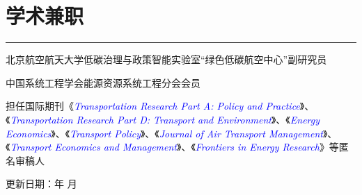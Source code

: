 \documentclass[letterpaper]{article}
\renewcommand{\today}{\number\year 年 \number\month 月}
\newcommand{\journal}[1]{\textcolor{blue}{\textit{#1}}}
\renewenvironment{itemize}{
  \begin{list}{}{
    \setlength{\leftmargin}{0.2in}
    \setlength{\itemsep}{0.1in}
    \setlength{\parskip}{0.025in}
    \setlength{\parsep}{0.025in}
  }
}{
  \end{list}
}
\begin{document}
\section*{学术兼职}
\hrule
\vspace{0.25cm}
  \begin{itemize}
    \item 北京航空航天大学低碳治理与政策智能实验室“绿色低碳航空中心”副研究员
    \vspace{-0.3cm}
    \item 中国系统工程学会能源资源系统工程分会会员
    \vspace{-0.3cm}
    \item 担任国际期刊《\journal{Transportation Research Part A: Policy and Practice}》、《\journal{Transportation Research Part D: Transport and Environment}》、《\journal{Energy Economics}》、《\journal{Transport Policy}》、《\journal{Journal of Air Transport Management}》、《\journal{Transport Economics and Management}》、《\journal{Frontiers in Energy Research}》等匿名审稿人
  \end{itemize}

\begin{flushright}
  \begin{footnotesize}
    更新日期：\today \\
  \end{footnotesize}
\end{flushright}
\end{document}
